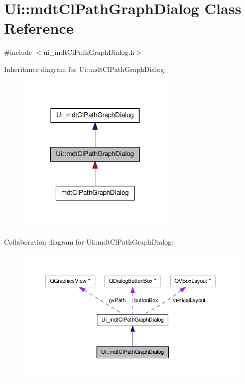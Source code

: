 \hypertarget{class_ui_1_1mdt_cl_path_graph_dialog}{\section{Ui\-:\-:mdt\-Cl\-Path\-Graph\-Dialog Class Reference}
\label{class_ui_1_1mdt_cl_path_graph_dialog}
}


{\ttfamily \#include $<$ui\-\_\-mdt\-Cl\-Path\-Graph\-Dialog.\-h$>$}



Inheritance diagram for Ui\-:\-:mdt\-Cl\-Path\-Graph\-Dialog\-:
\nopagebreak
\begin{figure}[H]
\begin{center}
\leavevmode
\includegraphics[width=212pt]{class_ui_1_1mdt_cl_path_graph_dialog__inherit__graph}
\end{center}
\end{figure}


Collaboration diagram for Ui\-:\-:mdt\-Cl\-Path\-Graph\-Dialog\-:
\nopagebreak
\begin{figure}[H]
\begin{center}
\leavevmode
\includegraphics[width=350pt]{class_ui_1_1mdt_cl_path_graph_dialog__coll__graph}
\end{center}
\end{figure}
